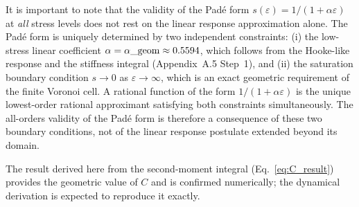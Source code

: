 \documentclass[11pt,letterpaper]{article}
\begin{document}
It is important to note that the validity of the Padé form 
$s(\varepsilon) = 1/(1+\alpha\varepsilon)$ at \emph{all} stress levels 
does not rest on the linear response approximation alone. The Padé 
form is uniquely determined by two independent constraints: (i) the 
low-stress linear coefficient $\alpha = \alpha\_{\rm geom} \approx 0.5594$,
which follows from the Hooke-like response and the stiffness integral
(Appendix~A.5 Step~1), and (ii) the saturation boundary 
condition $s \to 0$ as $\varepsilon \to \infty$, which is an exact 
geometric requirement of the finite Voronoi cell. A rational function 
of the form $1/(1+\alpha\varepsilon)$ is the unique lowest-order 
rational approximant satisfying both constraints simultaneously. The 
all-orders validity of the Padé form is therefore a consequence of 
these two boundary conditions, not of the linear response postulate 
extended beyond its domain.

The result derived here from the second-moment integral (Eq.~\ref{eq:C_result}) provides the geometric value of $C$ and is confirmed numerically; the dynamical derivation is expected to reproduce it exactly.
\end{document}
